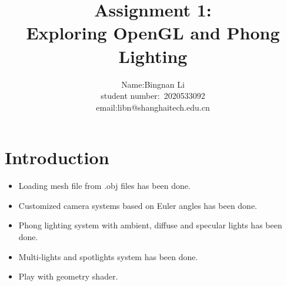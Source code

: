 \documentclass[acmtog]{acmart}
\title{Assignment 1:\\ Exploring OpenGL and Phong Lighting}
\author{Name:\quad Bingnan Li  \\ student number:\ 2020533092
\\email:\quad libn@shanghaitech.edu.cn}
\begin{document}
\maketitle

\vspace*{2 ex}

\section{Introduction}
\begin{itemize}
\item Loading mesh file from .obj files has been done.
\item Customized camera systems based on Euler angles has been done.
\item Phong lighting system with ambient, diffuse and specular lights has been done.
\item Multi-lights and spotlights system has been done.
\item Play with geometry shader. 
\end{itemize}
\end{document}
